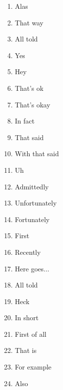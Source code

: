 \begin{enumerate}
  \item Alas
  \item That way
  \item All told
  \item Yes
  \item Hey
  \item That's ok
  \item That's okay
  \item In fact
  \item That said
  \item With that said
  \item Uh
  \item Admittedly
  \item Unfortunately
  \item Fortunately
  \item First
  \item Recently
  \item Here goes...
  \item All told
  \item Heck
  \item In short
  \item First of all
  \item That is
  \item For example
  \item Also
\end{enumerate}